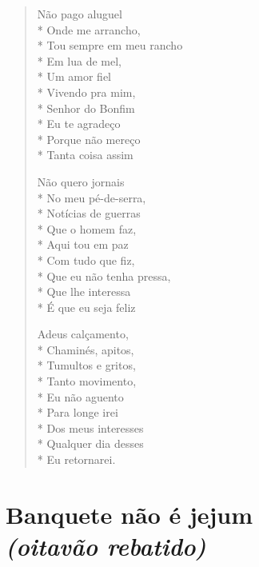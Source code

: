 \begin{verse}
Não pago aluguel\\*
Onde me arrancho,\\*
Tou sempre em meu rancho\\*
Em lua de mel,\\*
Um amor fiel\\*
Vivendo pra mim,\\*
Senhor do Bonfim\\*
Eu te agradeço\\*
Porque não mereço\\*
Tanta coisa assim

Não quero jornais\\*
No meu pé-de-serra,\\*
Notícias de guerras\\*
Que o homem faz,\\*
Aqui tou em paz\\*
Com tudo que fiz,\\*
Que eu não tenha pressa,\\*
Que lhe interessa\\*
É que eu seja feliz

Adeus calçamento,\\*
Chaminés, apitos,\\*
Tumultos e gritos,\\*
Tanto movimento,\\*
Eu não aguento\\*
Para longe irei\\*
Dos meus interesses\\*
Qualquer dia desses\\*
Eu retornarei.
\end{verse}


\chapter[Banquete não é jejum]{Banquete não é jejum\\\smallskip\textit{(oitavão rebatido)}}

